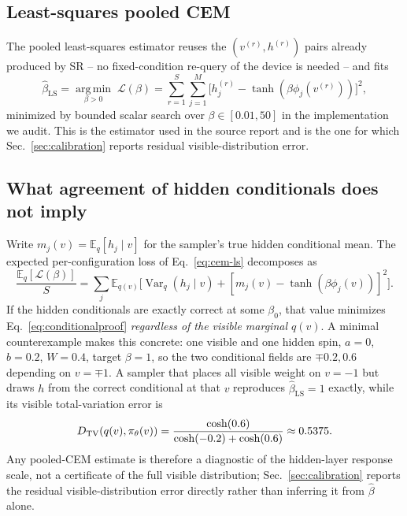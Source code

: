 \subsection{Least-squares pooled CEM}
\label{sec:cem-ls}

The pooled least-squares estimator reuses the $(v^{(r)},h^{(r)})$ pairs already produced by SR -- no fixed-condition re-query of the device is needed -- and fits
\begin{equation}
\widehat\beta_{\mathrm{LS}}=\operatorname*{arg\,min}_{\beta>0}\;
\mathcal L(\beta)=\sum_{r=1}^S\sum_{j=1}^M\big[h_j^{(r)}-\tanh(\beta\phi_j(v^{(r)}))\big]^2,
\label{eq:cem-ls}
\end{equation}
minimized by bounded scalar search over $\beta\in[0.01,50]$ in the implementation we audit. This is the estimator used in the source report and is the one for which Sec.~\ref{sec:calibration} reports residual visible-distribution error.

\subsection{What agreement of hidden conditionals does not imply}
\label{sec:cem-limits}

Write $m_j(v)=\mathbb E_q[h_j\mid v]$ for the sampler's true hidden conditional mean. The expected per-configuration loss of Eq.~\eqref{eq:cem-ls} decomposes as
\begin{equation}
\frac{\mathbb E_q[\mathcal L(\beta)]}{S}=\sum_j\mathbb E_{q(v)}\Big[\operatorname{Var}_q(h_j\mid v)+[m_j(v)-\tanh(\beta\phi_j(v))]^2\Big].
\label{eq:conditionalproof}
\end{equation}
If the hidden conditionals are exactly correct at some $\beta_0$, that value minimizes Eq.~\eqref{eq:conditionalproof} \emph{regardless of the visible marginal $q(v)$}. A minimal counterexample makes this concrete: one visible and one hidden spin, $a=0$, $b=0.2$, $W=0.4$, target $\beta=1$, so the two conditional fields are $\mp0.2,\allowbreak 0.6$ depending on $v=\mp1$. A sampler that places all visible weight on $v=-1$ but draws $h$ from the correct conditional at that $v$ reproduces $\widehat\beta_{\mathrm{LS}}=1$ exactly, while its visible total-variation error is
\begin{equation}
D_{\mathrm{TV}}(q(v),\pi_\theta(v))=\frac{\cosh(0.6)}{\cosh(-0.2)+\cosh(0.6)}\approx0.5375.
\label{eq:counterexample}
\end{equation}
Any pooled-CEM estimate is therefore a diagnostic of the hidden-layer response scale, not a certificate of the full visible distribution; Sec.~\ref{sec:calibration} reports the residual visible-distribution error directly rather than inferring it from $\widehat\beta$ alone.
